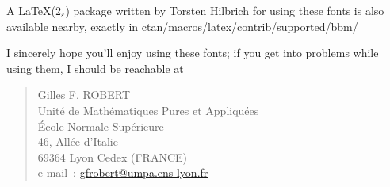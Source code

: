 \documentclass[DIV=9, pagesize=auto]{scrartcl}
\newcommand*{\twoepsilon}{2$_{\textstyle\varepsilon}$}
\begin{document}
A \LaTeX(\twoepsilon) package written by Torsten Hilbrich for using these fonts is also 
available nearby, exactly in \href{http://mirror.ctan.org/macros/latex/contrib/supported/bbm/}{ctan/macros/latex/contrib/supported/bbm/}

I sincerely hope you'll enjoy using these fonts; if you get into problems
while using them, I should be reachable at
%
\begin{quote}
  Gilles F. ROBERT\\
  Unit\'e de Math\'ematiques Pures et Appliqu\'ees\\
  \'Ecole Normale Sup\'erieure\\
  46, All\'ee d'Italie\\
  69364 Lyon Cedex (FRANCE)\\
  \medskip
  e-mail~: \href{mailto:gfrobert@umpa.ens-lyon.fr}{gfrobert@umpa.ens-lyon.fr}
\end{quote}
\end{document}
